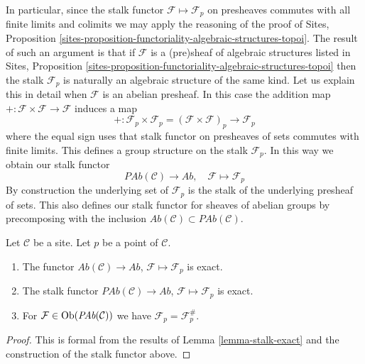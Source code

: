 \noindent
In particular, since the stalk functor $\mathcal{F} \mapsto \mathcal{F}_p$
on presheaves commutes with all finite limits and colimits we may apply the
reasoning of the proof of
Sites,
Proposition \ref{sites-proposition-functoriality-algebraic-structures-topoi}.
The result of such an argument is that if $\mathcal{F}$ is a
(pre)sheaf of algebraic structures listed in
Sites,
Proposition \ref{sites-proposition-functoriality-algebraic-structures-topoi}
then the stalk $\mathcal{F}_p$ is naturally an algebraic structure
of the same kind. Let us explain this in detail when $\mathcal{F}$
is an abelian presheaf. In this case the addition map
$+ : \mathcal{F} \times \mathcal{F} \to \mathcal{F}$ induces
a map
$$
+ :
\mathcal{F}_p \times \mathcal{F}_p
=
(\mathcal{F} \times \mathcal{F})_p
\longrightarrow
\mathcal{F}_p
$$
where the equal sign uses that stalk functor on presheaves of sets
commutes with finite limits. This defines a group structure on
the stalk $\mathcal{F}_p$. In this way we obtain
our stalk functor
$$
\textit{PAb}(\mathcal{C}) \longrightarrow \textit{Ab}, \quad
\mathcal{F} \longmapsto \mathcal{F}_p
$$
By construction the underlying set of $\mathcal{F}_p$ is the stalk of the
underlying presheaf of sets. This also defines our stalk functor for
sheaves of abelian groups by precomposing with the inclusion
$\textit{Ab}(\mathcal{C}) \subset \textit{PAb}(\mathcal{C})$.

\begin{lemma}
\label{lemma-stalk-exact-abelian}
Let $\mathcal{C}$ be a site.
Let $p$ be a point of $\mathcal{C}$.
\begin{enumerate}
\item The functor
$\textit{Ab}(\mathcal{C}) \to \textit{Ab}$,
$\mathcal{F} \mapsto \mathcal{F}_p$ is exact.
\item The stalk functor
$\textit{PAb}(\mathcal{C}) \to \textit{Ab}$,
$\mathcal{F}  \mapsto  \mathcal{F}_p$
is exact.
\item For $\mathcal{F} \in \mathop{\mathrm{Ob}}\nolimits(\textit{PAb}(\mathcal{C}))$
we have $\mathcal{F}_p = \mathcal{F}^\#_p$.
\end{enumerate}
\end{lemma}

\begin{proof}
This is formal from the results of
Lemma \ref{lemma-stalk-exact}
and the construction of the stalk functor above.
\end{proof}


